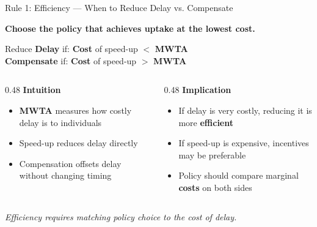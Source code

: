 \begin{frame}{Rule 1: Efficiency --- When to Reduce Delay vs. Compensate}
    \begin{center}
        \textbf{Choose the policy that achieves uptake at the lowest \textbf{cost}.}
    \end{center}

    \vspace{1.5em}
    \begin{center}
        \Large
        Reduce \textbf{Delay} if: \textbf{Cost} of speed-up $<$ \textbf{MWTA} \\
        \textbf{Compensate} if: \textbf{Cost} of speed-up $>$ \textbf{MWTA}
    \end{center}
    \vspace{1.5em}

    \begin{columns}[T]
        \begin{column}{0.48\textwidth}
            \textbf{Intuition}
            \begin{itemize}
                \item \textbf{MWTA} measures how costly delay is to individuals
                \item Speed-up reduces delay directly
                \item Compensation offsets delay without changing timing
            \end{itemize}
        \end{column}
        
        \hfill
        
        \begin{column}{0.48\textwidth}
            \textbf{Implication}
            \begin{itemize}
                \item If delay is very costly, reducing it is more \textbf{efficient}
                \item If speed-up is expensive, incentives may be preferable
                \item Policy should compare marginal \textbf{costs} on both sides
            \end{itemize}
        \end{column}
    \end{columns}
    
    \vfill
    \begin{center}
        \textit{Efficiency requires matching policy choice to the cost of delay.}
    \end{center}
\end{frame}
